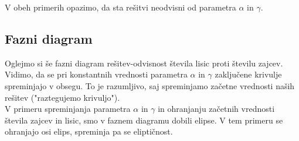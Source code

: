 \documentclass[slovene,11pt,a4paper]{article}
\numberwithin{equation}{section} %
\numberwithin{figure}{section} %
\numberwithin{table}{section} %
\begin{document}
V obeh primerih opazimo, da sta rešitvi neodvisni od parametra $\alpha$ in $\gamma$.
\subsection{Fazni diagram}
Oglejmo si še fazni diagram rešitev-odvisnost števila lisic proti številu zajcev. Vidimo, da se pri konstantnih vrednosti parametra $\alpha$ in $\gamma$ zaključene krivulje spreminjajo v obsegu. To je razumljivo, saj spreminjamo začetne vrednosti naših rešitev ("raztegujemo krivuljo").\\
V primeru spreminjanja parametra $\alpha$ in $\gamma$ in ohranjanju začetnih vrednosti števila zajcev in lisic, smo v faznem diagramu dobili elipse. V tem primeru se ohranjajo osi elips, spreminja pa se eliptičnost.

\begin{figure}[t!]
\noindent\makebox[\textwidth][l]{%
\hspace{-\dimexpr\oddsidemargin+1in}%

\begin{minipage}[t]{0.5\paperwidth}
\begin{flushleft}


\end{flushleft}
\end{minipage}}
\end{figure}
\end{document}
